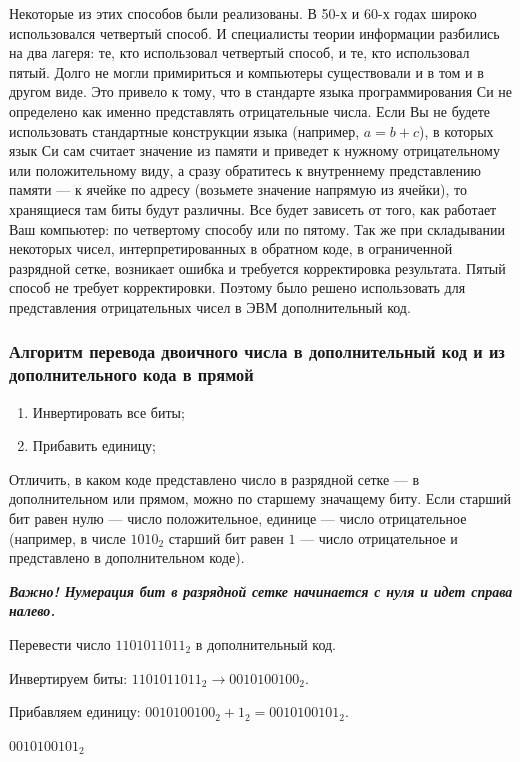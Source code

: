 Некоторые из этих способов были реализованы. В 50-х и 60-х годах широко использовался четвертый способ. И специалисты теории информации разбились на два лагеря: те, кто использовал четвертый способ, и те, кто использовал пятый. Долго не могли примириться и компьютеры существовали и в том и в другом виде. Это привело к тому, что в стандарте языка программирования Си не определено как именно представлять отрицательные числа. Если Вы не будете использовать стандартные конструкции языка (например, $a = b + c$), в которых язык Си сам считает значение из памяти и приведет к нужному отрицательному или положительному виду, а сразу обратитесь к внутреннему представлению памяти --- к ячейке по адресу (возьмете значение напрямую из ячейки), то хранящиеся там биты будут различны. Все будет зависеть от того, как работает Ваш компьютер: по четвертому способу или по пятому. Так же при складывании некоторых чисел, интерпретированных в обратном коде, в ограниченной разрядной сетке, возникает ошибка и требуется корректировка результата. Пятый способ не требует корректировки. Поэтому было решено использовать для представления отрицательных чисел в ЭВМ дополнительный код.

\subsubsection*{Алгоритм перевода двоичного числа в дополнительный код и из дополнительного кода в прямой}\label{subsubsec:additional-code-algorithm}

\begin{enumerate}
    \item Инвертировать все биты;
    \item Прибавить единицу;
\end{enumerate}

Отличить, в каком коде представлено число в разрядной сетке --- в дополнительном или прямом, можно по старшему значащему биту. Если старший бит равен нулю --- число положительное, единице --- число отрицательное (например, в числе $1010_{2}$ старший бит равен $1$ --- число отрицательное и представлено в дополнительном коде).

\bigskip

\textbf{\emph{Важно! Нумерация бит в разрядной сетке начинается с нуля и идет справа налево.}}

\begin{example}
    \task%
    Перевести число $1101011011_{2}$ в дополнительный код.

    \solution%
    Инвертируем биты: $1101011011_{2} \to 0010100100_{2}$.

    Прибавляем единицу: $0010100100_{2} + 1_{2} = 0010100101_{2}$.

    \answer%
    $0010100101_{2}$
\end{example}

